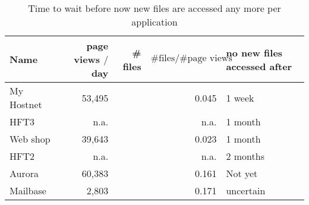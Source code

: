 \begin{table}[p]
	\small
	\centering
	\begin{tabular}{|l|r|r|r|l|}
	\hline	 
	 Name        & page views $/$ day & \# files & $\text{\# files}/\text{\# page views}$  & no new files accessed after\\
	\hline
	My Hostnet & 53,495 & \MyTwoFileCount            &  0.045 & 1 week\\
	HFT3       & n.a.   & \HftThreestrippedFileCount &   n.a. & 1 month\\
	Web shop   & 39,643 & \OntrackFileCount          &  0.023 & 1 month\\
	HFT2       & n.a.   & \HftTwoFileCount           &   n.a. & 2 months\\
	Aurora     & 60,383 & \AuroraFileCount           & 0.161 & Not yet\\
	Mailbase   &  2,803 & \MailbaseFileCount         & 0.171 & uncertain\\
	\hline 
	\end{tabular}
	\caption{Time to wait before now new files are accessed any more per application\label{tbl:time}}
\end{table}
\footnotetext{\hftTwoFootnote}

